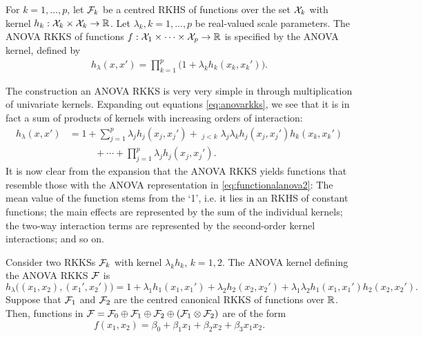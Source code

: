 \begin{definition}\label{def:anovarkks}
  For $k=1,\dots,p$, let ${\mathcal F}_k$ be a centred RKHS of functions over the set ${\mathcal X}_k$ with kernel $h_k:{\mathcal X}_k\times{\mathcal X}_k\to\mathbb{R}$. 
  Let $\lambda_k, k=1,\dots,p$ be real-valued scale parameters.
  The ANOVA RKKS of functions $f:{\mathcal X}_1\times\cdots\times{\mathcal X}_p\to\mathbb{R}$ is specified by the ANOVA kernel, defined by
  \begin{align}\label{eq:anovarkks}
    h_\lambda(x,x') = \prod_{k=1}^p \big( 1 + \lambda_k h_k(x_k,x_k') \big).
  \end{align}
\end{definition}

The construction an ANOVA RKKS is very very simple in through multiplication of univariate kernels.
Expanding out equations \cref{eq:anovarkks}, we see that it is in fact a sum of products of kernels with increasing orders of interaction:
\begin{align*}
  h_\lambda(x,x') 
  &= 1 + \sum_{j=1}^p \lambda_j h_j(x_j,x_j') + \mathop{\sum_{j,k=1}^p}_{j<k} \lambda_j\lambda_k h_j(x_j,x_j')h_k(x_k,x_k') \\
  &\phantom{==} + \cdots + \prod_{j=1}^p \lambda_j h_j(x_j,x_j').
\end{align*}
It is now clear from the expansion that the ANOVA RKKS yields functions that resemble those with the ANOVA representation in \cref{eq:functionalanova2}:
The mean value of the function stems from the `1', i.e. it lies in an RKHS of constant functions; the main effects are represented by the sum of the individual kernels; the two-way interaction terms are represented by the second-order kernel interactions; and so on.


\begin{example}
  Consider two RKKSs ${\mathcal F}_k$ with kernel $\lambda_k h_k$, $k=1,2$.
  The ANOVA kernel defining the ANOVA RKKS ${\mathcal F}$ is
  \[
    h_\lambda\big((x_1,x_2),(x_1',x_2') \big) = 1 + \lambda_1 h_1(x_1,x_1') + \lambda_2 h_2(x_2,x_2') + \lambda_1\lambda_2 h_1(x_1,x_1')h_2(x_2,x_2').
  \]  
  Suppose that ${\mathcal F}_1$ and ${\mathcal F}_2$ are the centred canonical RKKS of functions over $\mathbb{R}$.
  Then, functions in ${\mathcal F} = {\mathcal F}_0 \oplus {\mathcal F}_1 \oplus {\mathcal F}_2 \oplus ({\mathcal F}_1 \otimes {\mathcal F}_2)$ are of the form
  \[
    f(x_1,x_2) = \beta_0 + \beta_1x_1 + \beta_2x_2 + \beta_3x_1x_2.
  \]
\end{example}

